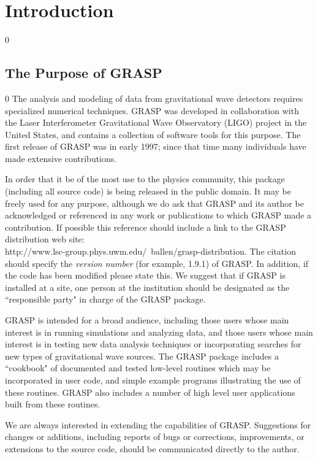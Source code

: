 \section{Introduction}
\setcounter{equation}0
\subsection{The Purpose of GRASP}
\setcounter{equation}0
The analysis and modeling of data from gravitational wave detectors
requires specialized numerical techniques.  GRASP was developed in
collaboration with the Laser Interferometer Gravitational Wave Observatory
(LIGO) project in the United States, and contains a collection of
software tools for this purpose.
The first release of GRASP was in early 1997; since that time many individuals have made extensive
contributions.

In order that it be of the most use to the physics community,
this package (including all source code) is being released in the
public domain.  It may be freely used for any purpose, although we do
ask that GRASP and its author be acknowledged or referenced in
any work or publications to which GRASP made a contribution.
If possible this reference should include a link to the GRASP distribution
web site:\\
{http://www.lsc-group.phys.uwm.edu/~ballen/grasp-distribution}.
The
citation should specify the {\it version number} (for example, 1.9.1) of
GRASP.  In addition, if the code has been modified please state this.
We suggest that if GRASP is installed at a site,
one person at the institution should be designated as the
``responsible party" in charge of the GRASP package.

GRASP is intended for a broad audience, including those users whose
main interest is in running simulations and analyzing data, and those
users whose main interest is in testing new data analysis techniques or
incorporating searches for new types of gravitational wave sources.
The GRASP package includes a ``cookbook" of documented and tested
low-level routines which may be incorporated in user code, and simple
example programs illustrating the use of these routines.  GRASP also
includes a number of high level user applications built from these
routines.

We are always interested in extending the capabilities of GRASP.
Suggestions for changes or additions, including reports of bugs or
corrections, improvements, or extensions to the source code, should be
communicated directly to the author.

